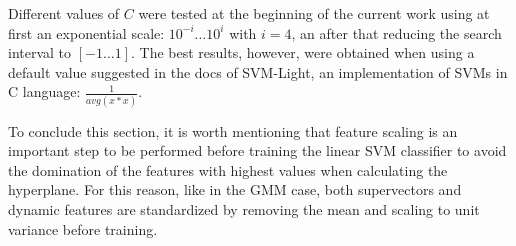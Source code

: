 Different values of $C$ were tested at the beginning of the
current work using at first an exponential scale:
$10^{-i} \ldots 10^{i}$ with $i=4$, an after that reducing the search interval to
$[-1 \ldots 1]$. The best results, however, were obtained when using a default value
suggested in the docs of SVM-Light, an implementation of SVMs in C language: $\frac{1}{avg(x*x)}$.

To conclude this section, it is worth mentioning that feature scaling is an important
step to be performed before training
the linear SVM classifier to avoid the domination of the features with highest values
when calculating the hyperplane. For this reason, like in the GMM case, both supervectors
and dynamic features are standardized by removing the mean and scaling to unit variance
before training.










